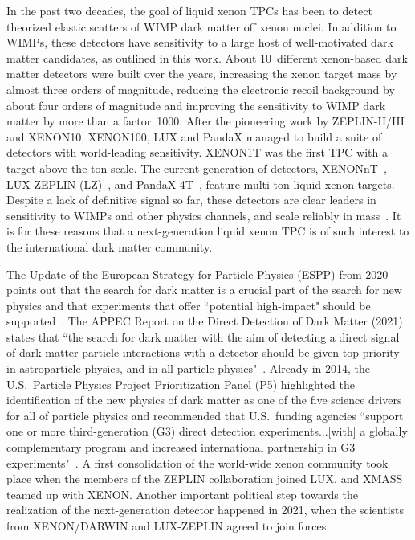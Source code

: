 In the past two decades, the goal of liquid xenon TPCs has been to detect theorized elastic scatters of WIMP dark matter off xenon nuclei. In addition to WIMPs, these detectors have sensitivity to a large host of well-motivated dark matter candidates, as outlined in this work. About 10~different xenon-based dark matter detectors were built over the years, increasing the xenon target mass by almost three orders of magnitude, reducing the electronic recoil background by about four orders of magnitude and improving the sensitivity to WIMP dark matter by more than a factor~1000. After the pioneering work by ZEPLIN-II/III and XENON10, XENON100, LUX and PandaX managed to build a suite of detectors with world-leading sensitivity. XENON1T was the first TPC with a target above the ton-scale. The current generation of detectors, XENONnT~\cite{Aprile:2020vtw}, LUX-ZEPLIN (LZ)~\cite{Akerib:2018lyp}, and PandaX-4T~\cite{Zhang:2018scp}, feature multi-ton liquid xenon targets. Despite a lack of definitive signal so far, these detectors are clear leaders in sensitivity to WIMPs and other physics channels, and scale reliably in mass~\cite{Aprile:2018dbl}. It is for these reasons that a next-generation liquid xenon TPC is of such interest to the international dark matter community.  

The Update of the European Strategy for Particle Physics (ESPP) from 2020 points out that the search for dark matter is a crucial part of the search for new physics and that experiments that offer ``potential high-impact" should be supported~\cite{ESPP:2020}. The APPEC Report on the Direct Detection of Dark Matter (2021) states that ``the search for dark matter with the aim of detecting a direct signal of dark matter particle interactions with a detector should be given top priority in astroparticle physics, and in all particle physics"~\cite{Billard:2021uyg}. Already in 2014, the U.S.~Particle Physics Project Prioritization Panel (P5) highlighted the identification of the new physics of dark matter as one of the five science drivers for all of particle physics and recommended that U.S.~funding agencies ``support one or more third-generation (G3) direct detection experiments...[with] a globally complementary program and increased international partnership in G3 experiments"~\cite{P5:2014}. A first consolidation of the world-wide xenon community took place when the members of the ZEPLIN collaboration joined LUX, and XMASS teamed up with XENON. Another important political step towards the realization of the next-generation detector happened in 2021, when the scientists from XENON/DARWIN and LUX-ZEPLIN agreed to join forces. 

